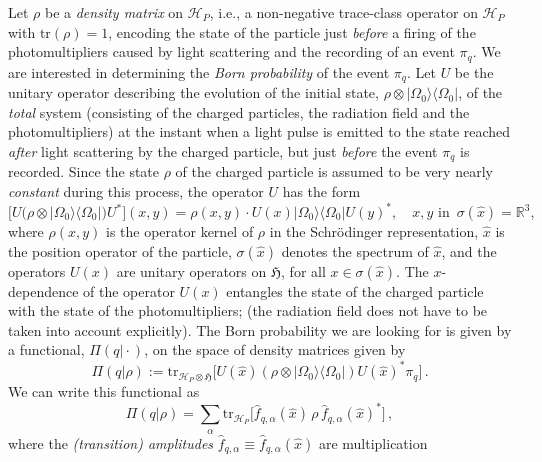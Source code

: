 \documentclass[12pt]{article}
\begin{document}
Let $\rho$ be a \textit{density matrix} on $\mathcal{H}_P$, i.e., a non-negative trace-class operator on $\mathcal{H}_P$ with 
$\text{tr}(\rho) = 1$, encoding the state of the particle just \textit{before} a firing of the photomultipliers caused by light scattering 
and the recording of an event $\pi_{q}$. We are interested in determining the \textit{Born probability} 
of the event $\pi_{q}$. Let $U$ be the unitary operator describing the evolution of the initial state, 
\mbox{$\rho \otimes | \Omega_0\rangle \langle \Omega_0 |$}, of the \textit{total} system (consisting of the charged particles, 
the radiation field and the photomultipliers) at the instant when a light pulse is emitted to the state reached \textit{after} 
light scattering by the charged particle, but just \textit{before} the event $\pi_{q}$ is recorded. 
Since the state $\rho$ of the charged particle is assumed to be very nearly \textit{constant} during this process, 
the operator $U$ has the form
\begin{equation}\label{Q-meas}
\big[U\big(\rho \otimes | \Omega_0\rangle \langle \Omega_0 |\big)U^{*}\big](x,y) = \rho(x,y) \cdot U(x) 
| \Omega_0\rangle \langle \Omega_0| U(y)^{*}, \quad x, y \text{ in } \,\sigma(\hat{x})=\mathbb{R}^{3},
\end{equation}
where $\rho(x,y)$ is the operator kernel of $\rho$ in the Schr\"odinger representation, $\hat{x}$ is the position operator of 
the particle, $\sigma(\hat{x})$ denotes the spectrum of $\hat{x}$, and the operators $U(x)$  are unitary operators on 
$\mathfrak{H}$, for all $x\in \sigma(\hat{x})$. 
The $x$-dependence of the operator $U(x)$ entangles the state of the charged particle with the state of the 
photomultipliers; (the radiation field does not have to be taken into account explicitly). The Born probability we are looking 
for is given by a functional, $\Pi(q\vert \cdot)$, on the space of density matrices given by
\begin{equation}\label{Born}
\Pi(q \vert \rho) := \text{tr}_{\mathcal{H}_{P}\otimes \mathfrak{H}} \Big[U(\hat{x})(\rho \otimes |\Omega_0\rangle \langle \Omega_0 |)U(\hat{x})^{*} \pi_{q}\Big]\,.
\end{equation}
We can write this functional as 
\begin{equation}\label{amplitudes}
\Pi(q \vert \rho) = \sum_{\alpha} \text{tr}_{\mathcal{H}_P} \Big[\widehat{f}_{q, \alpha}(\hat{x})\, \rho\, \widehat{f}_{q,\alpha}(\hat{x})^{*}\Big]\,,
\end{equation}
where the \textit{(transition) amplitudes} $\widehat{f}_{q, \alpha} \equiv \widehat{f}_{q,\alpha}(\hat{x})$ are multiplication 
\end{document}
